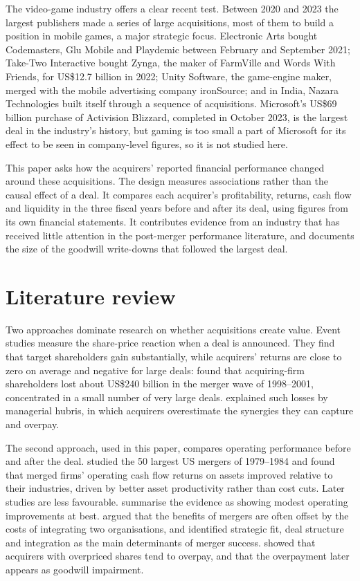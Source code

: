 \documentclass[11pt]{article}
\newcommand{\USD}{US\$}
\begin{document}
The video-game industry offers a clear recent test. Between 2020 and 2023 the largest publishers made a series of large acquisitions, most of them to build a position in mobile games, a major strategic focus. Electronic Arts bought Codemasters, Glu Mobile and Playdemic between February and September 2021; Take-Two Interactive bought Zynga, the maker of FarmVille and Words With Friends, for \USD 12.7 billion in 2022; Unity Software, the game-engine maker, merged with the mobile advertising company ironSource; and in India, Nazara Technologies built itself through a sequence of acquisitions. Microsoft's \USD 69 billion purchase of Activision Blizzard, completed in October 2023, is the largest deal in the industry's history, but gaming is too small a part of Microsoft for its effect to be seen in company-level figures, so it is not studied here.

This paper asks how the acquirers' reported financial performance changed around these acquisitions. The design measures associations rather than the causal effect of a deal. It compares each acquirer's profitability, returns, cash flow and liquidity in the three fiscal years before and after its deal, using figures from its own financial statements. It contributes evidence from an industry that has received little attention in the post-merger performance literature, and documents the size of the goodwill write-downs that followed the largest deal.

\section{Literature review}\label{sec:lit}

Two approaches dominate research on whether acquisitions create value. Event studies measure the share-price reaction when a deal is announced. They find that target shareholders gain substantially, while acquirers' returns are close to zero on average and negative for large deals: \citet{moeller2005} found that acquiring-firm shareholders lost about \USD 240 billion in the merger wave of 1998--2001, concentrated in a small number of very large deals. \citet{roll1986} explained such losses by managerial hubris, in which acquirers overestimate the synergies they can capture and overpay.

The second approach, used in this paper, compares operating performance before and after the deal. \citet{healy1992} studied the 50 largest US mergers of 1979--1984 and found that merged firms' operating cash flow returns on assets improved relative to their industries, driven by better asset productivity rather than cost cuts. Later studies are less favourable. \citet{andrade2001} summarise the evidence as showing modest operating improvements at best. \citet{lubatkin1983} argued that the benefits of mergers are often offset by the costs of integrating two organisations, and \citet{epstein2005} identified strategic fit, deal structure and integration as the main determinants of merger success. \citet{gu2011} showed that acquirers with overpriced shares tend to overpay, and that the overpayment later appears as goodwill impairment.
\end{document}
